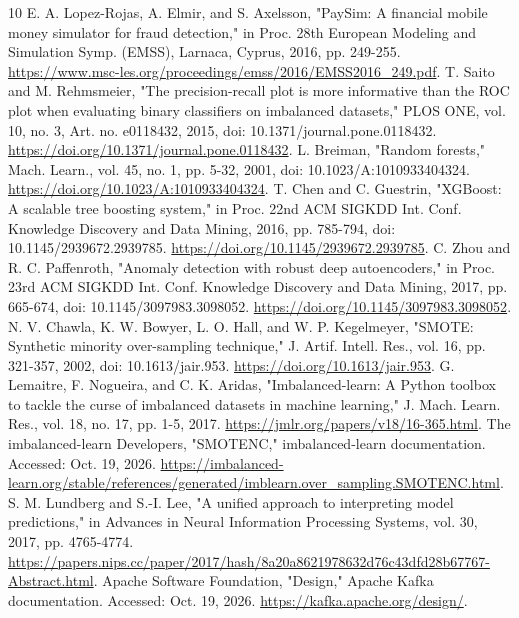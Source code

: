 \documentclass[conference]{IEEEtran}
\begin{document}
\balance
\begin{thebibliography}{10}
 E. A. Lopez-Rojas, A. Elmir, and S. Axelsson, "PaySim: A financial mobile money simulator for fraud detection," in Proc. 28th European Modeling and Simulation Symp. (EMSS), Larnaca, Cyprus, 2016, pp. 249-255. \url{https://www.msc-les.org/proceedings/emss/2016/EMSS2016_249.pdf}.
 T. Saito and M. Rehmsmeier, "The precision-recall plot is more informative than the ROC plot when evaluating binary classifiers on imbalanced datasets," PLOS ONE, vol. 10, no. 3, Art. no. e0118432, 2015, doi: 10.1371/journal.pone.0118432. \url{https://doi.org/10.1371/journal.pone.0118432}.
 L. Breiman, "Random forests," Mach. Learn., vol. 45, no. 1, pp. 5-32, 2001, doi: 10.1023/A:1010933404324. \url{https://doi.org/10.1023/A:1010933404324}.
 T. Chen and C. Guestrin, "XGBoost: A scalable tree boosting system," in Proc. 22nd ACM SIGKDD Int. Conf. Knowledge Discovery and Data Mining, 2016, pp. 785-794, doi: 10.1145/2939672.2939785. \url{https://doi.org/10.1145/2939672.2939785}.
 C. Zhou and R. C. Paffenroth, "Anomaly detection with robust deep autoencoders," in Proc. 23rd ACM SIGKDD Int. Conf. Knowledge Discovery and Data Mining, 2017, pp. 665-674, doi: 10.1145/3097983.3098052. \url{https://doi.org/10.1145/3097983.3098052}.
 N. V. Chawla, K. W. Bowyer, L. O. Hall, and W. P. Kegelmeyer, "SMOTE: Synthetic minority over-sampling technique," J. Artif. Intell. Res., vol. 16, pp. 321-357, 2002, doi: 10.1613/jair.953. \url{https://doi.org/10.1613/jair.953}.
 G. Lemaitre, F. Nogueira, and C. K. Aridas, "Imbalanced-learn: A Python toolbox to tackle the curse of imbalanced datasets in machine learning," J. Mach. Learn. Res., vol. 18, no. 17, pp. 1-5, 2017. \url{https://jmlr.org/papers/v18/16-365.html}.
 The imbalanced-learn Developers, "SMOTENC," imbalanced-learn documentation. Accessed: Oct. 19, 2026. \url{https://imbalanced-learn.org/stable/references/generated/imblearn.over_sampling.SMOTENC.html}.
 S. M. Lundberg and S.-I. Lee, "A unified approach to interpreting model predictions," in Advances in Neural Information Processing Systems, vol. 30, 2017, pp. 4765-4774. \url{https://papers.nips.cc/paper/2017/hash/8a20a8621978632d76c43dfd28b67767-Abstract.html}.
 Apache Software Foundation, "Design," Apache Kafka documentation. Accessed: Oct. 19, 2026. \url{https://kafka.apache.org/design/}.
\end{thebibliography}
\end{document}
